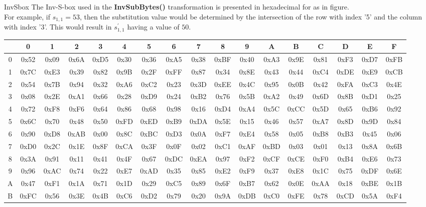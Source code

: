\begin{frame}[t]{InvSbox}
	\small
	The Inv-S-box used in the \textbf{InvSubBytes()} transformation is presented in hexadecimal for as in figure. \\
	For example, if $s_{1,1} = {53}$, then the substitution value would be determined by the intersection of the row with index '5' and the column with index '3'. This would result in $s^{'}_{1,1}$ having a value of ${50}$.
	
	\begin{table}[]
		\tiny 
		\setlength{\tabcolsep}{2pt} 
		\begin{tabular}{c|cccccccccccccccc}
			& 0    &    1 &    2 &    3 &    4 &    5 &    6 &    7 &    8 &    9 &    A &    B &  C &   D  &  E &  F \\ \hline
			0 & 0x52 & 0x09 & 0x6A & 0xD5 & 0x30 & 0x36 & 0xA5 & 0x38 & 0xBF & 0x40 & 0xA3 & 0x9E & 0x81 & 0xF3 & 0xD7 & 0xFB \\
			1 & 0x7C & 0xE3 & 0x39 & 0x82 & 0x9B & 0x2F & 0xFF & 0x87 & 0x34 & 0x8E & 0x43 & 0x44 & 0xC4 & 0xDE & 0xE9 & 0xCB \\
			2 & 0x54 & 0x7B & 0x94 & 0x32 & 0xA6 & 0xC2 & 0x23 & 0x3D & 0xEE & 0x4C & 0x95 & 0x0B & 0x42 & 0xFA & 0xC3 & 0x4E \\
			3 & 0x08 & 0x2E & 0xA1 & 0x66 & 0x28 & 0xD9 & 0x24 & 0xB2 & 0x76 & 0x5B & 0xA2 & 0x49 & 0x6D & 0x8B & 0xD1 & 0x25 \\
			4 & 0x72 & 0xF8 & 0xF6 & 0x64 & 0x86 & 0x68 & 0x98 & 0x16 & 0xD4 & 0xA4 & 0x5C & 0xCC & 0x5D & 0x65 & 0xB6 & 0x92 \\
			5 & 0x6C & 0x70 & 0x48 & 0x50 & 0xFD & 0xED & 0xB9 & 0xDA & 0x5E & 0x15 & 0x46 & 0x57 & 0xA7 & 0x8D & 0x9D & 0x84 \\
			6 & 0x90 & 0xD8 & 0xAB & 0x00 & 0x8C & 0xBC & 0xD3 & 0x0A & 0xF7 & 0xE4 & 0x58 & 0x05 & 0xB8 & 0xB3 & 0x45 & 0x06 \\
			7 & 0xD0 & 0x2C & 0x1E & 0x8F & 0xCA & 0x3F & 0x0F & 0x02 & 0xC1 & 0xAF & 0xBD & 0x03 & 0x01 & 0x13 & 0x8A & 0x6B \\
			8 & 0x3A & 0x91 & 0x11 & 0x41 & 0x4F & 0x67 & 0xDC & 0xEA & 0x97 & 0xF2 & 0xCF & 0xCE & 0xF0 & 0xB4 & 0xE6 & 0x73 \\
			9 & 0x96 & 0xAC & 0x74 & 0x22 & 0xE7 & 0xAD & 0x35 & 0x85 & 0xE2 & 0xF9 & 0x37 & 0xE8 & 0x1C & 0x75 & 0xDF & 0x6E \\
			A & 0x47 & 0xF1 & 0x1A & 0x71 & 0x1D & 0x29 & 0xC5 & 0x89 & 0x6F & 0xB7 & 0x62 & 0x0E & 0xAA & 0x18 & 0xBE & 0x1B \\
			B & 0xFC & 0x56 & 0x3E & 0x4B & 0xC6 & 0xD2 & 0x79 & 0x20 & 0x9A & 0xDB & 0xC0 & 0xFE & 0x78 & 0xCD & 0x5A & 0xF4 \\

\end{tabular}
\end{table}
\end{frame}
